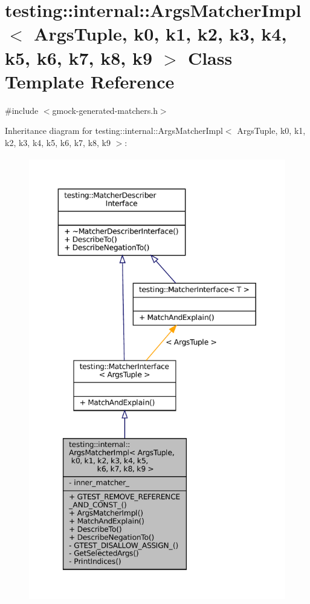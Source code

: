 \hypertarget{classtesting_1_1internal_1_1ArgsMatcherImpl}{}\section{testing\+:\+:internal\+:\+:Args\+Matcher\+Impl$<$ Args\+Tuple, k0, k1, k2, k3, k4, k5, k6, k7, k8, k9 $>$ Class Template Reference}
\label{classtesting_1_1internal_1_1ArgsMatcherImpl}


{\ttfamily \#include $<$gmock-\/generated-\/matchers.\+h$>$}



Inheritance diagram for testing\+:\+:internal\+:\+:Args\+Matcher\+Impl$<$ Args\+Tuple, k0, k1, k2, k3, k4, k5, k6, k7, k8, k9 $>$\+:
\nopagebreak
\begin{figure}[H]
\begin{center}
\leavevmode
\includegraphics[height=550pt]{classtesting_1_1internal_1_1ArgsMatcherImpl__inherit__graph}
\end{center}
\end{figure}


